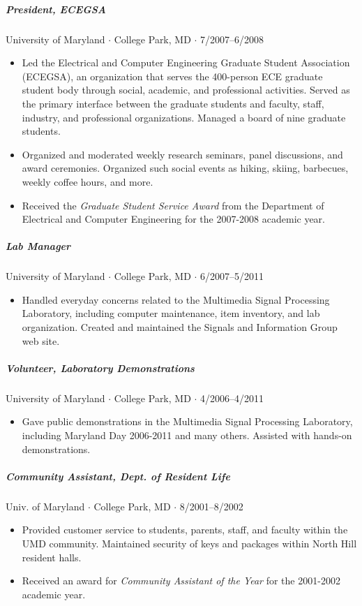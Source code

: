 \documentclass[10pt,letterpaper]{article}
\begin{document}
\subparagraph{President, ECEGSA}
University of Maryland $\cdot$ College Park, MD $\cdot$ 7/2007--6/2008
\begin{itemize}
\item Led the Electrical and Computer Engineering Graduate Student Association (ECEGSA), an organization that serves the 400-person ECE graduate student body through social, academic, and professional activities.  Served as the primary interface between the graduate students and faculty, staff, industry, and professional organizations.  Managed a board of nine graduate students. 
\item Organized and moderated weekly research seminars, panel discussions, and award ceremonies.  Organized such social events as hiking, skiing, barbecues, weekly coffee hours, and more.
\item Received the \textit{Graduate Student Service Award} from the Department of Electrical and Computer Engineering for the 2007-2008 academic year.
\end{itemize}

\subparagraph{Lab Manager}
University of Maryland $\cdot$ College Park, MD $\cdot$ 6/2007--5/2011
\begin{itemize}
	\item Handled everyday concerns related to the Multimedia Signal Processing Laboratory, including computer maintenance, item inventory, and lab organization. Created and maintained the Signals and Information Group web site.
\end{itemize}

\subparagraph{Volunteer, Laboratory Demonstrations}
University of Maryland $\cdot$ College Park, MD $\cdot$ 4/2006--4/2011
\begin{itemize}
    \item Gave public demonstrations in the Multimedia Signal Processing Laboratory, including Maryland Day 2006-2011 and many others. Assisted with hands-on demonstrations.
\end{itemize}

\subparagraph{Community Assistant, Dept. of Resident Life}
Univ. of Maryland $\cdot$ College Park, MD $\cdot$ 8/2001--8/2002
\begin{itemize}
\item Provided customer service to students, parents, staff, and faculty within the UMD community. Maintained security of keys and packages within North Hill resident halls.
\item Received an award for \textit{Community Assistant of the Year} for the 2001-2002 academic year.
\end{itemize}
\end{document}
